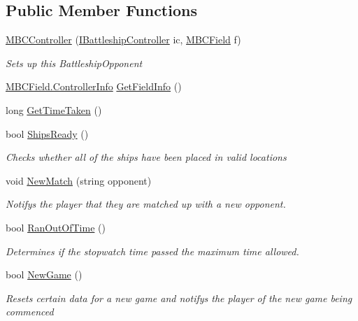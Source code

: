 \subsection*{Public Member Functions}
\begin{DoxyCompactItemize}
\item 
\hyperlink{class_m_b_c_core_1_1_m_b_c_controller_a09ad5b80cd7828140a30317b9c253f41}{M\-B\-C\-Controller} (\hyperlink{interface_m_b_c_core_1_1_i_battleship_controller}{I\-Battleship\-Controller} ic, \hyperlink{class_m_b_c_core_1_1_m_b_c_field}{M\-B\-C\-Field} f)
\begin{DoxyCompactList}\small\item\em Sets up this Battleship\-Opponent\end{DoxyCompactList}\item 
\hyperlink{class_m_b_c_core_1_1_m_b_c_field_1_1_controller_info}{M\-B\-C\-Field.\-Controller\-Info} \hyperlink{class_m_b_c_core_1_1_m_b_c_controller_a681a8cbf30f805996acffed014eb3944}{Get\-Field\-Info} ()
\item 
long \hyperlink{class_m_b_c_core_1_1_m_b_c_controller_ad301387b76264a22550a136536af06bf}{Get\-Time\-Taken} ()
\item 
bool \hyperlink{class_m_b_c_core_1_1_m_b_c_controller_a2d0425bb37c9d14153dc31a2053ffeb1}{Ships\-Ready} ()
\begin{DoxyCompactList}\small\item\em Checks whether all of the ships have been placed in valid locations\end{DoxyCompactList}\item 
void \hyperlink{class_m_b_c_core_1_1_m_b_c_controller_aebaf2975ea1a55b87b4e23afb8c0d6ae}{New\-Match} (string opponent)
\begin{DoxyCompactList}\small\item\em Notifys the player that they are matched up with a new opponent.\end{DoxyCompactList}\item 
bool \hyperlink{class_m_b_c_core_1_1_m_b_c_controller_acb45e1f47a6263fba0618a856def539c}{Ran\-Out\-Of\-Time} ()
\begin{DoxyCompactList}\small\item\em Determines if the stopwatch time passed the maximum time allowed.\end{DoxyCompactList}\item 
bool \hyperlink{class_m_b_c_core_1_1_m_b_c_controller_a75905cef62d94b3c5665640d650f8c0d}{New\-Game} ()
\begin{DoxyCompactList}\small\item\em Resets certain data for a new game and notifys the player of the new game being commenced\end{DoxyCompactList}\item 

\end{DoxyCompactItemize}
